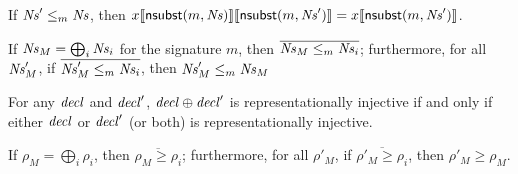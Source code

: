 \begin{lemma}
\label{lem:absorb}
If $\mathit{Ns}' \le_m \mathit{Ns}$, then $x\llbracket\textsf{nsubst}(m, \mathit{Ns})\rrbracket\llbracket\textsf{nsubst}(m, \mathit{Ns}')\rrbracket = x\llbracket\textsf{nsubst}(m, \mathit{Ns}')\rrbracket$.
\end{lemma}

\begin{lemma}
\label{lem:export}
If $\mathit{Ns}_M = \bigoplus_i \mathit{Ns}_i$ for the signature $m$, then
$\overline{\mathit{Ns}_M \le_m \mathit{Ns}_i}$; furthermore,
for all $\mathit{Ns}'_M$, if
$\overline{\mathit{Ns}'_M \le_m \mathit{Ns}_i}$, then
$\mathit{Ns}'_M \le_m \mathit{Ns}_M$
\end{lemma}



\begin{lemma}
\label{lem:inj}
For any $\mathit{decl}$ and $\mathit{decl}'$, $\mathit{decl} \oplus \mathit{decl}'$ is representationally injective
if and only if either $\mathit{decl}$ or $\mathit{decl}'$ (or both) is representationally
injective.
\end{lemma}

\begin{lemma}
\label{lem:role}
If $\rho_M = \bigoplus_i \rho_i$, then
$\overline{\rho_M \ge \rho_i}$; furthermore,
for all $\rho'_M$, if $\overline{\rho'_M \ge \rho_i}$,
then $\rho'_M \ge \rho_M$.
\end{lemma}

